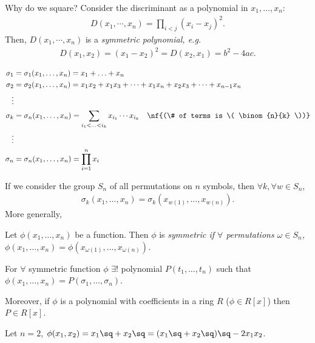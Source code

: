 \documentclass[a4paper]{article}
\begin{document}
Why do we square? Consider the discriminant as a polynomial in \( x_1,\ldots,x_n \):
\begin{align*}
  D(x_1,\cdots,x_n) = \prod_{i<j}(x_i-x_j)^2.
\end{align*}
Then, \( D(x_1,\cdots,x_n) \) is a \it{symmetric} polynomial, e.g. \begin{align*}
  D(x_1,x_2) = (x_1-x_2)^2 = D(x_2,x_1) = b^2-4ac.
\end{align*}

\begin{tdefinition}
  \begin{align*}
    \sigma_1 &= \sigma_1(x_1,\ldots, x_n)= x_1+\ldots+x_n \\
    \sigma_2 &= \sigma_2(x_1,\ldots, x_n)= x_1x_2+x_1x_3+\cdots+x_1x_n+x_2x_3+\cdots+x_{n-1}x_n \\
    \vdots \\
    \sigma_k &= \sigma_n(x_1,\ldots, x_n)= \sum_{i_1<\ldots<i_ k} x_{i_1}\cdots x_{i_k} \quad \nf {(\# of terms is \( \binom{n}{k} \))} \\
    \vdots \\
    \sigma_n &= \sigma_n(x_1,\ldots, x_n)= \prod_{i=1}^{n} x_i
  \end{align*}
\end{tdefinition}

If we consider the group \( S_n \) of all permutations on \( n \) symbols, then \( \forall k, \forall w\in S_n \), \begin{align*}
  \sigma_k(x_1,\ldots,x_n) = \sigma_k(x_{w(1)},\ldots,x_{w(n)}).
\end{align*}
More generally,
\begin{tdefinition}
  Let \( \phi(x_1, \ldots, x_n) \) be a function. Then \( \phi \) is \it{symmetric} if \( \forall \) permutations \( \omega\in S_n \), \( \phi(x_1,\ldots, x_n) = \phi(x_{\omega(1)},\ldots,x_{\omega(n)})\).
\end{tdefinition}

\begin{ttheorem} For \( \forall \) symmetric function \( \phi \) \( \exists ! \) polynomial \( P(t_1, \ldots,t_n) \) such that \( \phi(x_1,\ldots,x_n) =P(\sigma_1,\ldots,\sigma_n)\).

Moreover, if \( \phi \) is a polynomial with coefficients in a ring \( R \) (\( \phi\in R[x] \)) then \( P\in R[x] \).
\end{ttheorem}

\begin{example}
  Let \( n=2 \), \( \phi(x_1,x_2) = x_1\sq+x_2\sq = (x_1\sq+x_2\sq)\sq - 2x_1x_2 \).
\end{example}
\end{document}
